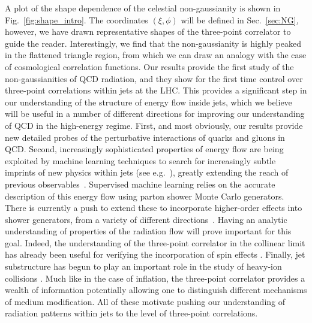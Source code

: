\documentclass[letterpaper,11pt]{article}
\def\Fig#1{Fig.~{\ref{#1}}}
\DeclareRobustCommand{\Sec}[1]{Sec.~\ref{#1}}
\DeclareRobustCommand{\Fig}[1]{Fig.~\ref{#1}}
\begin{document}
A plot of the shape dependence of the celestial non-gaussianity is shown in \Fig{fig:shape_intro}. The coordinates $(\xi, \phi)$ will be defined in \Sec{sec:NG}, however, we have drawn representative shapes of the three-point correlator to guide the reader.
%
Interestingly, we find that the non-gaussianity is highly peaked in the flattened triangle region, from which we can draw an analogy with the case of cosmological correlation functions. 
%
Our results provide the first study of the non-gaussianities of QCD radiation, and they show for the first time control over three-point correlations within jets at the LHC.
%
This provides a significant step in our understanding of the structure of energy flow inside jets, which we believe will be useful in a number of different directions for improving our understanding of QCD in the high-energy regime.
%
First, and most obviously, our results provide new detailed probes of the perturbative interactions of quarks and gluons in QCD.
%
Second, increasingly sophisticated properties of energy flow are being exploited by machine learning techniques to search for increasingly subtle imprints of new physics within jets (see e.g.~\cite{Komiske:2018cqr,Qu:2019gqs,CMS:2020poo}), greatly extending the reach of previous observables~\cite{Thaler:2010tr,Thaler:2011gf,Larkoski:2013eya,Larkoski:2014zma,Larkoski:2014gra,Larkoski:2015kga,Moult:2016cvt,Larkoski:2017cqq,Larkoski:2017iuy,Komiske:2017aww,Komiske:2018cqr,Komiske:2019fks}.
%
Supervised machine learning relies on the accurate description of this energy flow using parton shower Monte Carlo generators.
%
There is currently a push to extend these to incorporate higher-order effects into shower generators, from a variety of different directions~\cite{Li:2016yez,Hoche:2017hno,Hoche:2017iem,Dulat:2018vuy,Gellersen:2021eci,Hamilton:2020rcu,Dasgupta:2020fwr,Hamilton:2021dyz,Karlberg:2021kwr}.
%
Having an analytic understanding of properties of the radiation flow will prove important for this goal.
%
Indeed, the understanding of the three-point correlator in the collinear limit \cite{Chen:2020adz} has already been useful for verifying the incorporation of spin effects \cite{Hamilton:2021dyz,Karlberg:2021kwr}.
%
Finally, jet substructure has begun to play an important role in the study of heavy-ion collisions \cite{Andrews:2018jcm,Cunqueiro:2021wls}.
%
Much like in the case of inflation, the three-point correlator provides a wealth of information potentially allowing one to distinguish different mechanisms of medium modification.
%
All of these motivate pushing our understanding of radiation patterns within jets to the level of three-point correlations. 
\end{document}
